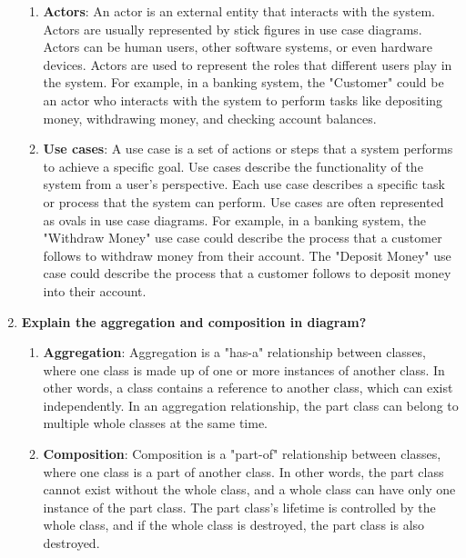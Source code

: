 \documentclass[11pt]{article}
\begin{document}
\begin{enumerate}
	      \begin{enumerate}
		      \item \textbf{Actors}: An actor is an external entity that interacts with the system. Actors are usually represented by stick figures in use case diagrams. Actors can be human users, other software systems, or even hardware devices. Actors are used to represent the roles that different users play in the system. For example, in a banking system, the "Customer" could be an actor who interacts with the system to perform tasks like depositing money, withdrawing money, and checking account balances.

		      \item \textbf{Use cases}: A use case is a set of actions or steps that a system performs to achieve a specific goal. Use cases describe the functionality of the system from a user's perspective. Each use case describes a specific task or process that the system can perform. Use cases are often represented as ovals in use case diagrams. For example, in a banking system, the "Withdraw Money" use case could describe the process that a customer follows to withdraw money from their account. The "Deposit Money" use case could describe the process that a customer follows to deposit money into their account.
	      \end{enumerate}

	\item \textbf{Explain the aggregation and composition in diagram?}\\

	      \begin{enumerate}
		      \item \textbf{Aggregation}: Aggregation is a "has-a" relationship between classes, where one class is made up of one or more instances of another class. In other words, a class contains a reference to another class, which can exist independently. In an aggregation relationship, the part class can belong to multiple whole classes at the same time.

		      \item \textbf{Composition}: Composition is a "part-of" relationship between classes, where one class is a part of another class. In other words, the part class cannot exist without the whole class, and a whole class can have only one instance of the part class. The part class's lifetime is controlled by the whole class, and if the whole class is destroyed, the part class is also destroyed.
	      \end{enumerate}

\end{enumerate}
\end{document}
